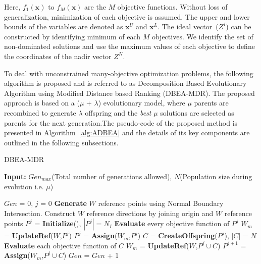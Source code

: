 \documentclass{sig-alternate}
\begin{document}
\noindent Here, $f_1(\textbf{x})$  to $f_M(\textbf{x})$ are the $M$ objective functions. Without loss of generalization, minimization of each objective is assumed. The upper and lower bounds of the variables are denoted as $\textbf{x}^{U}$ and $\textbf{x}^{L}$. The ideal vector~($Z^I$) can be constructed by identifying minimum of each $M$ objectives. We identify the set of non-dominated solutions and use the maximum values of each objective to define the coordinates of the nadir vector $Z^N$. 

To deal with unconstrained many-objective optimization problems, the following algorithm is proposed and is referred to as Decomposition Based Evolutionary Algorithm using Modified Distance based Ranking (DBEA-MDR). The proposed approach is based on a ($\mu$ + $\lambda$) evolutionary model, where $\mu$ parents are recombined to generate $\lambda$ offspring and the \textit{best} $\mu$ solutions are selected as parents for the next generation.The pseudo-code of the proposed method is presented in Algorithm~\ref{alg:ADBEA} and the details of its key components are outlined in the following subsections.

\begin{algorithm}[!ht]\footnotesize
   \caption{DBEA-MDR}
   \textbf{Input:} $Gen_{max}$\hspace{1mm}(Total number of generations allowed), $N$\hspace{1mm}(Population size during evolution i.e. $\mu$)
   \begin{algorithmic}[1]
   	\STATE $Gen$ = 0, $j$ = 0
   	\STATE \textbf{Generate} $W$ reference points using Normal Boundary Intersection.
   	\STATE Construct $W$ reference directions by joining origin and $W$ reference points
   	\STATE $P^j$ = \textbf{Initialize}(), $\left|P^j\right| = N_I$ 
   	\STATE \textbf{Evaluate} every objective function of $P^j$
   	\STATE $W_m$ = \textbf{UpdateRef}($W$,$P^j$)
   	\STATE $P^j$ = \textbf{Assign}($W_m$,$P^j$) 	
   	\STATE $C$ = \textbf{CreateOffspring}($P^j$), $\left|C\right|$ = $N$
   	\STATE \textbf{Evaluate} each objective function of $C$
   	\STATE $W_m$ = \textbf{UpdateRef}($W$,$P^j \cup C$)
   	\STATE $P^{j+1}$ = \textbf{Assign}($W_m$,$P^j \cup C$)   
   	\STATE $Gen$ = $Gen$ + 1
   	\ENDWHILE		
  
	\end{algorithmic}
   \label{alg:ADBEA}
\end{algorithm} 
\end{document}
